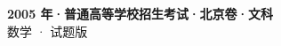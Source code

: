 \documentclass[zihao=-4, a4paper]{ctexart}
\begin{document}
\begin{center}
  {\Large\bfseries 2005 年·普通高等学校招生考试·北京卷·文科}\\[4pt]
  {\large 数学 · 试题版}
\end{center}
\medskip
{}

\end{document}
